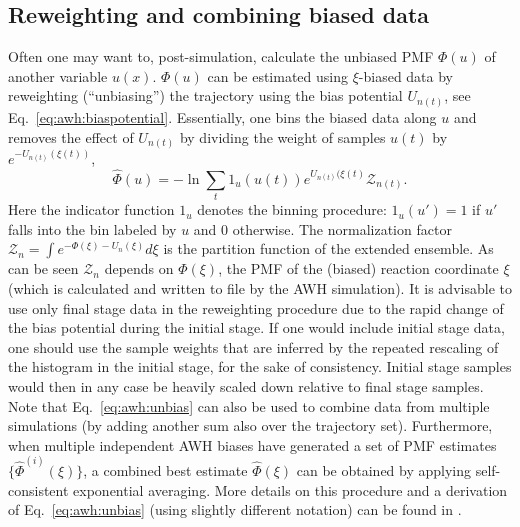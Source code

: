 \subsection{Reweighting and combining biased data}\label{sec:awh:reweight}
Often one may want to, post-simulation, calculate the unbiased PMF $\Phi(u)$ of another variable $u(x)$.
$\Phi(u)$ can be estimated using $\xi$-biased data 
by reweighting (``unbiasing'') the trajectory
using the bias potential  $U_{n(t)}$, see Eq.~\ref{eq:awh:biaspotential}.
Essentially, one bins the biased data along $u$ and
removes the  effect of $U_{n(t)}$ by dividing the weight of samples $u(t)$  by $e^{-U_{n(t)}(\xi(t))}$,
\begin{equation}\label{eq:awh:unbias}
\hat{\Phi}(u)  = -\ln 
\sum_t 1_u(u(t))e^{U_{n(t)}(\xi(t)} \mathcal{Z}_{n(t)}.
\end{equation}
Here the indicator function $1_u$ denotes the binning procedure: $1_u(u') = 1$ if $u'$ falls into the bin labeled by $u$ and $0$ otherwise.
The normalization factor $\mathcal{Z}_n = \int e^{-\Phi(\xi) - U_{n}(\xi)}d \xi$ is the partition function of the extended ensemble.
As can be seen $\mathcal{Z}_n$  depends on  $\Phi(\xi)$, the PMF of the (biased) reaction coordinate $\xi$
(which is calculated and written to file by the AWH simulation).
It is advisable to use only final stage data in the reweighting procedure due to the rapid change of the bias potential during the initial stage.
If one would include initial stage data, 
one should %
use the sample weights that are inferred by the repeated rescaling of  the histogram in the initial stage,
for the sake of consistency.
Initial stage samples would then in any case be heavily scaled down relative to final stage samples.
Note that  Eq.~\ref{eq:awh:unbias}  can also be used to combine data from multiple simulations (by adding another sum also over the trajectory set).
Furthermore, when multiple independent AWH biases have generated a set of PMF estimates $\{\hat{\Phi}^{(i)}(\xi)\}$,
a combined best estimate $\hat{\Phi}(\xi)$ can be obtained by applying self-consistent exponential averaging.
More details on this procedure and a derivation of Eq.~\ref{eq:awh:unbias} (using slightly different notation) can be found in \cite{lindahl2017sequence}.

